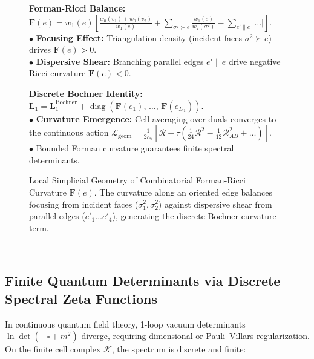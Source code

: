 \documentclass[
    12pt,
    a4paper,
    headings=normal,
    twoside=false,
    open=any,
    parskip=half
]{scrbook}
\begin{document}
\begin{figure}[htbp]
\begin{tcolorbox}[colback=white, colframe=secondarycolor!70, arc=2mm, boxrule=0.7pt, left=6pt, right=6pt, top=4pt, bottom=4pt, width=\linewidth]
\begin{minipage}[t]{0.48\textwidth}
  \textbf{\color{maincolor}Forman-Ricci Balance:}\\[1pt]
  $\mathbf{F}(e) = w_1(e) \left[ \frac{w_0(v_1)+w_0(v_2)}{w_1(e)} + \sum_{\sigma^2 \succ e} \frac{w_1(e)}{w_2(\sigma^2)} - \sum_{e' \parallel e} \left| \dots \right| \right]$.\\[2pt]
  $\bullet$ \textbf{Focusing Effect:} Triangulation density (incident faces $\sigma^2 \succ e$) drives $\mathbf{F}(e) > 0$.\\[1pt]
  $\bullet$ \textbf{Dispersive Shear:} Branching parallel edges $e' \parallel e$ drive negative Ricci curvature $\mathbf{F}(e) < 0$.
\end{minipage}\hfill
\begin{minipage}[t]{0.48\textwidth}
  \textbf{\color{accentcolor}Discrete Bochner Identity:}\\[1pt]
  $\mathbf{L}_1 = \mathbf{L}_1^{\text{Bochner}} + \operatorname{diag}\left( \mathbf{F}(e_1), \, \dots, \, \mathbf{F}(e_{D_1}) \right)$.\\[2pt]
  $\bullet$ \textbf{Curvature Emergence:} Cell averaging over duals converges to the continuous action $\mathcal{L}_{\text{geom}} = \frac{1}{2\kappa_6}[\mathcal{R} + \tau(\frac{1}{24}\mathcal{R}^2 - \frac{1}{12}\mathcal{R}_{AB}^2 + \dots)]$.\\[1pt]
  $\bullet$ Bounded Forman curvature guarantees finite spectral determinants.
\end{minipage}
\end{tcolorbox}
\vspace{-2mm}
\caption{Local Simplicial Geometry of Combinatorial Forman-Ricci Curvature $\mathbf{F}(e)$. The curvature along an oriented edge balances focusing from incident faces ($\sigma_1^2, \sigma_2^2$) against dispersive shear from parallel edges ($e'_1 \dots e'_4$), generating the discrete Bochner curvature term.}
\label{fig:ch1_forman_ricci_edge_geometry}
\end{figure}

---

\subsection{Finite Quantum Determinants via Discrete Spectral Zeta Functions}

In continuous quantum field theory, 1-loop vacuum determinants $\ln\det(-\square + m^2)$ diverge, requiring dimensional or Pauli--Villars regularization. On the finite cell complex $\mathcal{K}$, the spectrum is discrete and finite:
\end{document}
